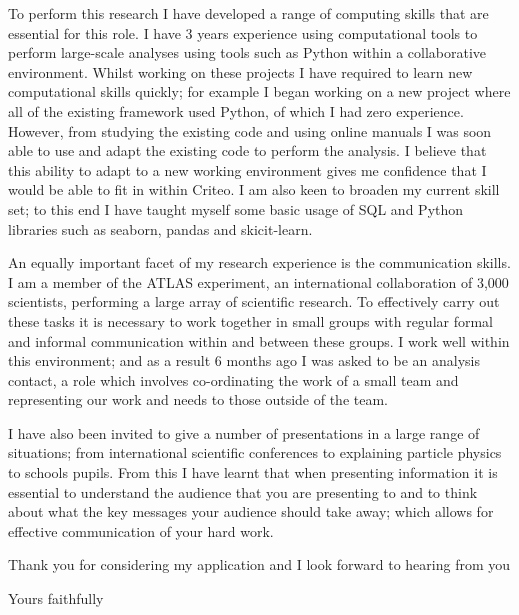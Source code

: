 \documentclass[]{letter}
\begin{document}
\begin{letter}{}
To perform this research I have developed a range of computing skills that are essential for this role.
I have 3 years experience using computational tools to perform large-scale analyses using tools such as
Python within a collaborative environment.
Whilst working on these projects I have required to learn new computational skills quickly;
for example I began working on a new project where all of the existing framework used Python,
of which I had zero experience.
However, from studying the existing code and using online manuals
I was soon able to use and adapt the existing code to perform the analysis.
I believe that this ability to adapt to a new working environment gives me confidence that I would be able to fit in within Criteo.
I am also keen to broaden my current skill set;
to this end I have taught myself some basic usage of SQL and Python libraries such as seaborn, pandas and skicit-learn.


An equally important facet of my research experience is the communication skills.
I am a member of the ATLAS experiment, an international collaboration of 3,000 scientists,
performing a large array of scientific research.
To effectively carry out these tasks it is necessary to work together in small groups
with regular formal and informal communication within and between these groups.
I work well within this environment;
and as a result 6 months ago I was asked to be an analysis contact,
a role which involves co-ordinating the work of a small team and representing our work and needs to those outside of the team.

I have also been invited to give a number of presentations in a large range of situations;
from international scientific conferences to explaining particle physics to schools pupils.
From this I have learnt  that when presenting information it is essential to understand the audience that you are presenting to
and to think about what the key messages your audience should take away;
which allows for effective communication of your hard work.

Thank you for considering my application and I look forward to hearing from you

\vspace{5mm}

\closing{Yours faithfully}


\end{letter}
\end{document}
